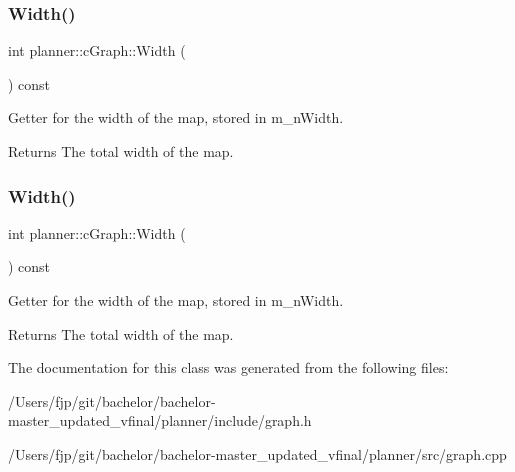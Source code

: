 \subsubsection{\texorpdfstring{Width()}{Width()}\hspace{0.1cm}{\footnotesize\ttfamily [1/2]}}
{\footnotesize\ttfamily int planner\+::c\+Graph\+::\+Width (\begin{DoxyParamCaption}{ }\end{DoxyParamCaption}) const}



Getter for the width of the map, stored in m\+\_\+n\+Width. 

\begin{DoxyReturn}{Returns}
The total width of the map. 
\end{DoxyReturn}
\mbox{\label{classplanner_1_1c_graph_a25e3f4ee33c86a8a0c3a31c42dac7607}} 
\subsubsection{\texorpdfstring{Width()}{Width()}\hspace{0.1cm}{\footnotesize\ttfamily [2/2]}}
{\footnotesize\ttfamily int planner\+::c\+Graph\+::\+Width (\begin{DoxyParamCaption}{ }\end{DoxyParamCaption}) const}



Getter for the width of the map, stored in m\+\_\+n\+Width. 

\begin{DoxyReturn}{Returns}
The total width of the map. 
\end{DoxyReturn}


The documentation for this class was generated from the following files\+:\begin{DoxyCompactItemize}
\item 
/\+Users/fjp/git/bachelor/bachelor-\/master\+\_\+updated\+\_\+vfinal/planner/include/graph.\+h\item 
/\+Users/fjp/git/bachelor/bachelor-\/master\+\_\+updated\+\_\+vfinal/planner/src/graph.\+cpp\end{DoxyCompactItemize}

